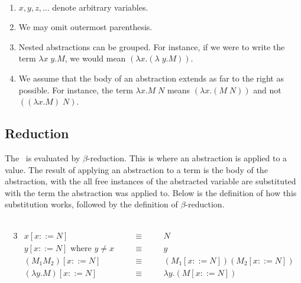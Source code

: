 \begin{definition}$\ $\vspace{-0.5cm}
    \begin{enumerate}
        \item \(x, y, z,...\) denote arbitrary variables.
        \item We may omit outermost parenthesis.
        \item Nested abstractions can be grouped. For instance, if we were to write the term $\lambda x \;y. M$, we would mean $(\lambda x . (\lambda\;y. M))$.
        \item We assume that the body of an abstraction extends as far to the right as possible. For instance, the term $\lambda x. M\;N$ means $(\lambda x. (M\;N))$ and not $((\lambda x. M)\;N)$. 
    \end{enumerate}
\end{definition}

\newcommand{\BetaReduce}{\rightarrow_\beta}
\subsection{Reduction}
The \lcalc\ is evaluated by $\beta$-reduction. This is where an abstraction is applied to a value. The result of applying an abstraction to a term is the body of the abstraction, with the all free  instances of the abstracted variable are substituted with the term the abstraction was applied to. Below is the definition of how this substitution works, followed by the definition of $\beta$-reduction. 

\begin{definition}$\ $\vspace{-0.5cm}
\begin{alignat*}{3}
&x[x::=N]                           \quad && \equiv \quad && N\\
&y[x::=N] \text{ where } y \ne x    \quad && \equiv \quad && y\\
&(M_1 M_2)[x::=N]                   \quad && \equiv \quad && (M_1[x::=N]) (M_2[x::=N])\\
&(\lambda y.M)[x::=N]                \quad && \equiv \quad && \lambda y.(M[x::=N])
\end{alignat*}  
\end{definition}

